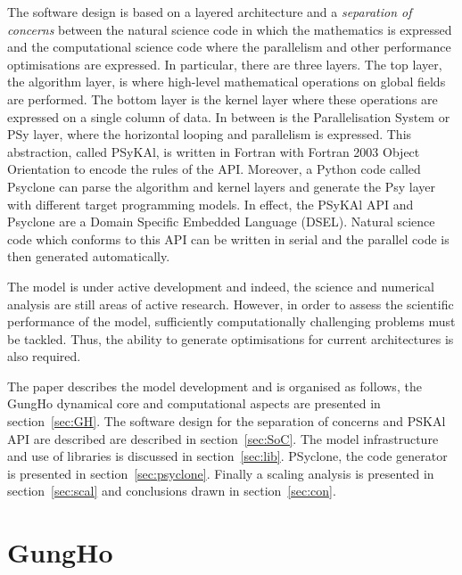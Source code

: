 \documentclass[times]{elsarticle}
\begin{document}
The software design is based on a layered architecture and a 
{\em separation of concerns} between the natural science code in which
the mathematics is expressed and the computational science code where the
parallelism and other performance optimisations are expressed. In particular,
there are three layers. The top layer, the algorithm layer, is where high-level mathematical 
operations on global fields are performed. The bottom layer is the kernel layer
where these operations are expressed on a single column of data. In between is the
Parallelisation System or PSy layer, where the horizontal looping and parallelism is
expressed. This abstraction, called PSyKAl, is written in Fortran with Fortran 2003
Object Orientation to encode the rules of the API.
Moreover, a Python code called Psyclone can parse the algorithm and kernel layers and
generate the Psy layer with different target programming models. In effect, the PSyKAl API
and Psyclone are a Domain Specific Embedded Language (DSEL). Natural science code which
conforms to this API can be written in serial and the parallel code is then generated automatically.

The model is under active development and indeed, the science and
numerical analysis are still areas of active research. However, in
order to assess the scientific performance of the model, sufficiently
computationally challenging problems must be tackled. Thus, the
ability to generate optimisations for current architectures is also
required. 

The paper describes the model development and is organised as follows,
the GungHo dynamical core and computational aspects are presented in
section~\ref{sec:GH}. The software design for the separation of
concerns and PSKAl API are described are described in
section~\ref{sec:SoC}. The model infrastructure and use of libraries
is discussed in section~\ref{sec:lib}. PSyclone, the code generator is
presented in section~\ref{sec:psyclone}. Finally a scaling analysis is
presented in section~\ref{sec:scal} and conclusions drawn in
section~\ref{sec:con}.

\section{\label{sec:GH}GungHo}
\end{document}
